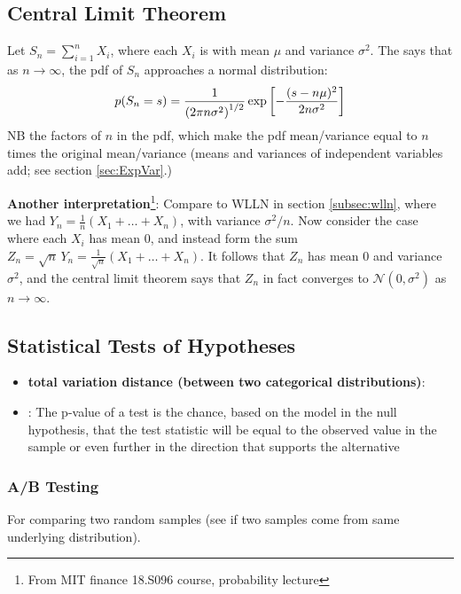 \documentclass[11pt]{article}
\begin{document}
\subsection{Central Limit Theorem}
Let $S_n = \sum_{i=1}^n X_i$, where each $X_i$ is  with mean $\mu$ and variance
$\sigma^2$. The  says that as $n \to \infty$, the pdf of
$S_n$ approaches a normal distribution:
\begin{equation}
  p(S_n = s) = \frac{1}{\left( 2 \pi n \sigma^2 \right)^{1/2}} \exp \left[ - \frac{(s - n
    \mu)^2}{2 n \sigma^2} \right] 
\end{equation}
NB the factors of $n$ in the pdf, which make the pdf mean/variance equal to $n$ times
the original mean/variance (\eie means and variances of independent variables add; see
section \ref{sec:ExpVar}.)

\textbf{Another interpretation}\footnote{From MIT finance 18.S096 course, probability
  lecture}: Compare to WLLN in section \ref{subsec:wlln}, where we had
$Y_n = \frac{1}{n} (X_1 + \dots + X_n)$, with variance $\sigma^2/n$. Now consider the
case where each $X_i$ has mean 0, and instead form the sum
$Z_n = \sqrt{n}\, Y_n = \frac{1}{\sqrt{n}} (X_1 + \dots + X_n)$. It follows that $Z_n$
has mean 0 and variance $\sigma^2$, and the central limit theorem says that $Z_n$ in
fact converges to $\mathcal{N}(0, \sigma^2)$ as $n \to \infty$.


\subsection{Statistical Tests of Hypotheses}

\begin{itemize}
  \item \textbf{total variation distance (between two categorical distributions)}:
  \item {}: The p-value of a test is the chance, based on the model in the
  null hypothesis, that the test statistic will be equal to the observed value in the
  sample or even further in the direction that supports the alternative


\end{itemize}

\subsubsection{A/B Testing}
For comparing two random samples (see if two samples come from same underlying
distribution).  
\end{document}
